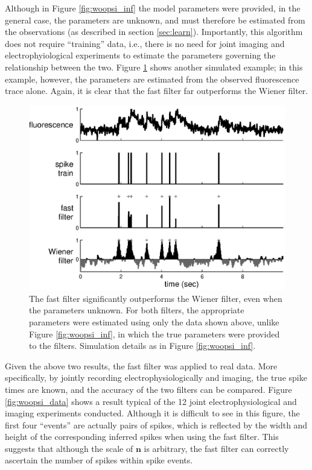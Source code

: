 \documentclass{article}
\providecommand{\ve}[1]{\boldsymbol{#1}}
\newcommand{\bn}{\ve{n}}
\newcommand{\foopsi}{fast }
\begin{document}
Although in Figure \ref{fig:woopsi_inf} the model parameters were provided, in the general case, the parameters are unknown, and must therefore be estimated from the observations (as described in section \ref{sec:learn}). Importantly, this algorithm does not require ``training'' data, i.e., there is no need for joint imaging and electrophyiological experiments to estimate the parameters governing the relationship between the two.  Figure \ref{fig:woopsi_learn} shows another simulated example; in this example, however, the parameters are estimated from the observed fluorescence trace alone.  Again, it is clear that the \foopsi filter far outperforms the Wiener filter.

\begin{figure}[h!]
\centering \includegraphics[width=.9\linewidth]{woopsi_learn_b13}
\caption[parameters may be estimated using the \foopsi filter]{The \foopsi filter significantly outperforms the Wiener filter, even when the parameters unknown.  For both filters, the appropriate parameters were estimated using only the data shown above, unlike Figure \ref{fig:woopsi_inf}, in which the true parameters were provided to the filters. Simulation details as in Figure \ref{fig:woopsi_inf}.} \label{fig:woopsi_learn}
\end{figure}

Given the above two results, the \foopsi filter was applied to real data.  More specifically, by jointly recording electrophysiologically and imaging, the true spike times are known, and the accuracy of the two filters can be compared.  Figure \ref{fig:woopsi_data} shows a result typical of the 12 joint electrophysiological and imaging experiments conducted. Although it is difficult to see in this figure, the first four ``events'' are actually pairs of spikes, which is reflected by the width and height of the corresponding inferred spikes when using the \foopsi filter. %
This suggests that although the scale of $\bn$ is arbitrary, the \foopsi filter can correctly ascertain the number of spikes within spike events.  
\end{document}

